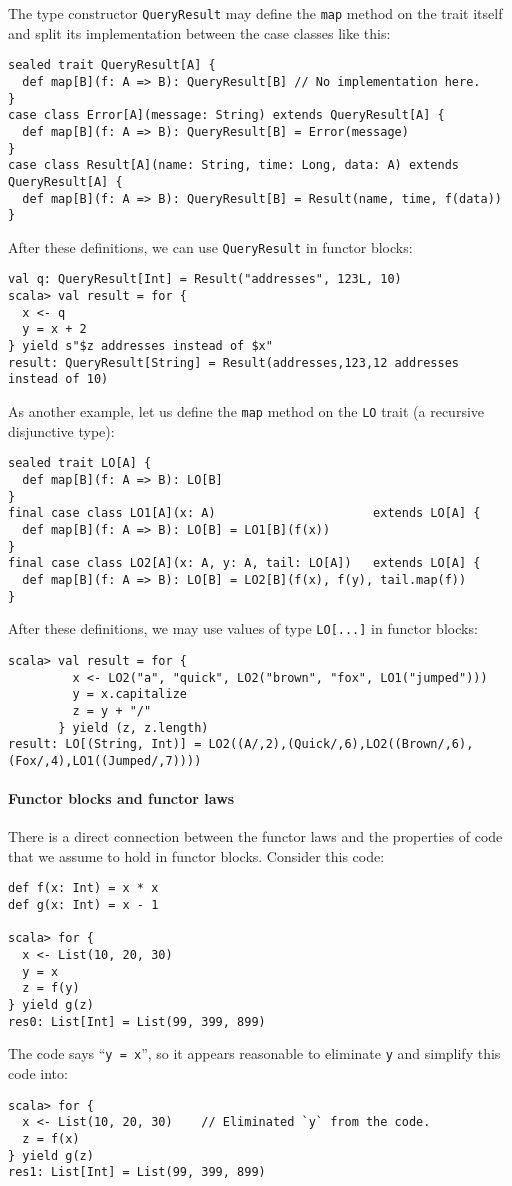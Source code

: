 The type constructor \lstinline!QueryResult! may define the \lstinline!map!
method on the trait itself and split its implementation between the
case classes like this:
\begin{lstlisting}
sealed trait QueryResult[A] {
  def map[B](f: A => B): QueryResult[B] // No implementation here.
}
case class Error[A](message: String) extends QueryResult[A] {
  def map[B](f: A => B): QueryResult[B] = Error(message)
}
case class Result[A](name: String, time: Long, data: A) extends QueryResult[A] {
  def map[B](f: A => B): QueryResult[B] = Result(name, time, f(data))
}
\end{lstlisting}
After these definitions, we can use \lstinline!QueryResult! in functor
blocks:
\begin{lstlisting}
val q: QueryResult[Int] = Result("addresses", 123L, 10)
scala> val result = for {
  x <- q
  y = x + 2
} yield s"$z addresses instead of $x"
result: QueryResult[String] = Result(addresses,123,12 addresses instead of 10)
\end{lstlisting}

As another example, let us define the \lstinline!map! method on the
\lstinline!LO! trait (a recursive disjunctive type):
\begin{lstlisting}
sealed trait LO[A] {
  def map[B](f: A => B): LO[B]
}
final case class LO1[A](x: A)                      extends LO[A] {
  def map[B](f: A => B): LO[B] = LO1[B](f(x))
}
final case class LO2[A](x: A, y: A, tail: LO[A])   extends LO[A] {
  def map[B](f: A => B): LO[B] = LO2[B](f(x), f(y), tail.map(f))
}
\end{lstlisting}
After these definitions, we may use values of type \lstinline!LO[...]!
in functor blocks:
\begin{lstlisting}
scala> val result = for {
         x <- LO2("a", "quick", LO2("brown", "fox", LO1("jumped")))
         y = x.capitalize
         z = y + "/"
       } yield (z, z.length)
result: LO[(String, Int)] = LO2((A/,2),(Quick/,6),LO2((Brown/,6),(Fox/,4),LO1((Jumped/,7))))
\end{lstlisting}


\paragraph{Functor blocks and functor laws}

There is a direct connection between the functor laws and the properties
of code that we assume to hold in functor blocks. Consider this code:
\begin{lstlisting}
def f(x: Int) = x * x
def g(x: Int) = x - 1

scala> for {
  x <- List(10, 20, 30)
  y = x
  z = f(y)
} yield g(z)
res0: List[Int] = List(99, 399, 899)
\end{lstlisting}
The code says \textsf{``}\lstinline!y = x!\textsf{''}, so it appears reasonable to
eliminate \lstinline!y! and simplify this code into:
\begin{lstlisting}
scala> for {
  x <- List(10, 20, 30)    // Eliminated `y` from the code.
  z = f(x)
} yield g(z)
res1: List[Int] = List(99, 399, 899)
\end{lstlisting}

